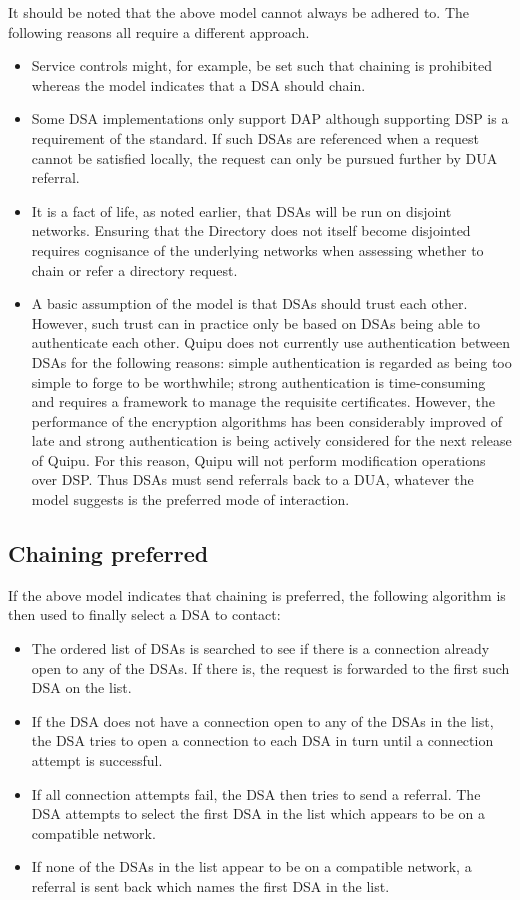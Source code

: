 It should be noted that the above model cannot always be adhered to.  The
following reasons all require a different approach.
\begin{itemize}
\item[{}]
Service controls might, for example, be set such that chaining is prohibited
whereas the model indicates that a DSA should chain.
\item[{}]
Some DSA implementations only support DAP although supporting DSP is a
requirement of the standard. If such DSAs are referenced when a request
cannot be satisfied locally, the request can only be pursued further
by DUA referral.
\item[{}]
It is a fact of life, as noted earlier, that DSAs will
be run on disjoint networks.  Ensuring that the Directory does not itself
become disjointed requires cognisance of the underlying networks when
assessing whether to chain or refer a directory request.
\item[{}]
A basic assumption of the model is that DSAs should trust each other.
However, such trust can in practice only be based on DSAs being able to
authenticate each other.  Quipu does not currently use authentication
between DSAs for the following reasons: simple authentication is regarded as
being too simple to forge to be worthwhile; strong authentication is
time-consuming and requires a framework to manage the requisite certificates.
However, the performance of the encryption algorithms has been considerably
improved of late and strong authentication is being actively considered for
the next release of Quipu.
For this reason, Quipu will not perform modification
operations over DSP.  Thus DSAs must send referrals back to a DUA, whatever
the model suggests is the preferred mode of interaction.
\end{itemize}
\subsection{Chaining preferred}
If the above model indicates that chaining is preferred, the following
algorithm is then used to finally select a DSA to contact:
\begin{itemize}
\item[{}]
The ordered list of DSAs is searched to see if there is a connection already
open to any of the DSAs.  If there is, the request is forwarded to the first
such DSA on the list.
\item[{}]
If the DSA does not have a connection open to any of the DSAs in the list,
the DSA tries to open a connection to each DSA in turn until a connection
attempt is successful.
\item[{}]
If all connection attempts fail, the DSA then tries to send a referral. The
DSA attempts to select the first DSA in the list which appears to be on a
compatible network.
\item[{}]
If none of the DSAs in the list appear to be on a compatible network, a
referral is sent back which names the first DSA in the list.
\end{itemize}
